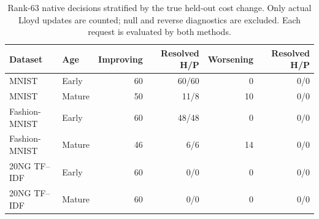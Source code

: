 \begin{table}[t]
\centering\small
\caption{Rank-63 native decisions stratified by the true held-out cost change. Only actual Lloyd updates are counted; null and reverse diagnostics are excluded. Each request is evaluated by both methods.}\label{tab:natural-regressions}
\begin{tabular}{llrrrr}
\toprule
Dataset & Age & Improving & Resolved H/P & Worsening & Resolved H/P \\
\midrule
MNIST & Early & 60 & 60/60 & 0 & 0/0 \\
MNIST & Mature & 50 & 11/8 & 10 & 0/0 \\
Fashion-MNIST & Early & 60 & 48/48 & 0 & 0/0 \\
Fashion-MNIST & Mature & 46 & 6/6 & 14 & 0/0 \\
20NG TF--IDF & Early & 60 & 0/0 & 0 & 0/0 \\
20NG TF--IDF & Mature & 60 & 0/0 & 0 & 0/0 \\
\bottomrule\end{tabular}
\end{table}
